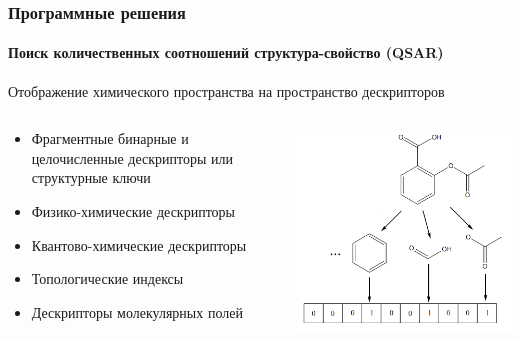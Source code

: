 \begin{frame}
\begin{columns}
\begin{column}{0.5\textwidth}
\end{column}
\end{columns}
  \end{frame}

\begin{frame}
  \frametitle{Программные решения}
  \framesubtitle{Поиск количественных соотношений структура-свойство (QSAR\footnotemark)}

  \begin{center}Отображение химического пространства на пространство дескрипторов\end{center}
    \begin{columns}
      \begin{column}{0.5\textwidth}
        \begin{itemize}
        \item Фрагментные бинарные и целочисленные дескрипторы или структурные ключи
        \item Физико-химические дескрипторы
        \item Квантово-химические дескрипторы
        \item Топологические индексы
        \item Дескрипторы молекулярных полей
        \end{itemize}
      \end{column}
      \begin{column}{0.5\textwidth}
        \includegraphics[scale=0.5]{images/screens.png}
      \end{column}
    \end{columns}
\end{frame}


